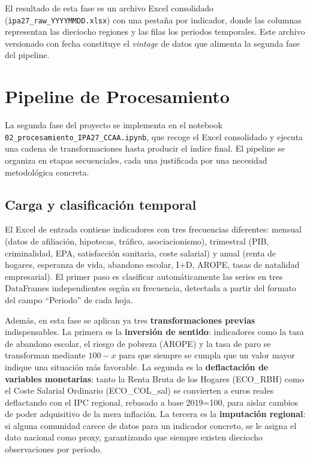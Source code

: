 \documentclass[12pt,a4paper]{article}
\begin{document}
El resultado de esta fase es un archivo Excel consolidado (\texttt{ipa27\_raw\_YYYYMMDD.xlsx}) con una pestaña por indicador, donde las columnas representan las dieciocho regiones y las filas los periodos temporales. Este archivo versionado con fecha constituye el \textit{vintage} de datos que alimenta la segunda fase del pipeline.

\section{Pipeline de Procesamiento}

La segunda fase del proyecto se implementa en el notebook \texttt{02\_procesamiento\_IPA27\_CCAA.ipynb}, que recoge el Excel consolidado y ejecuta una cadena de transformaciones hasta producir el índice final. El pipeline se organiza en etapas secuenciales, cada una justificada por una necesidad metodológica concreta.

\subsection{Carga y clasificación temporal}

El Excel de entrada contiene indicadores con tres frecuencias diferentes: mensual (datos de afiliación, hipotecas, tráfico, asociacionismo), trimestral (PIB, criminalidad, EPA, satisfacción sanitaria, coste salarial) y anual (renta de hogares, esperanza de vida, abandono escolar, I+D, AROPE, tasas de natalidad empresarial). El primer paso es clasificar automáticamente las series en tres DataFrames independientes según su frecuencia, detectada a partir del formato del campo ``Periodo'' de cada hoja.

Además, en esta fase se aplican ya tres \textbf{transformaciones previas} indispensables. La primera es la \textbf{inversión de sentido}: indicadores como la tasa de abandono escolar, el riesgo de pobreza (AROPE) y la tasa de paro se transforman mediante $100 - x$ para que siempre se cumpla que un valor mayor indique una situación más favorable. La segunda es la \textbf{deflactación de variables monetarias}: tanto la Renta Bruta de los Hogares (ECO\_RBH) como el Coste Salarial Ordinario (ECO\_COL\_sal) se convierten a euros reales deflactando con el IPC regional, rebasado a base 2019=100, para aislar cambios de poder adquisitivo de la mera inflación. La tercera es la \textbf{imputación regional}: si alguna comunidad carece de datos para un indicador concreto, se le asigna el dato nacional como proxy, garantizando que siempre existen dieciocho observaciones por periodo.
\end{document}
